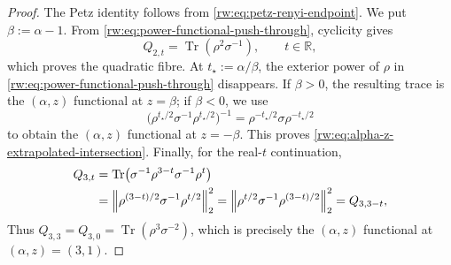 \documentclass[10pt,a4paper]{amsart}
\begin{document}
\begin{proof}
The Petz identity follows from
\eqref{rw:eq:petz-renyi-endpoint}.  We put $\beta:=\alpha-1$.  From
\eqref{rw:eq:power-functional-push-through}, cyclicity gives
\begin{equation}
 Q_{2,t}=\operatorname{Tr}(\rho^2\sigma^{-1}),
 \qquad t\in\mathbb R,
 \label{rw:eq:real-t-quadratic-identity}
\end{equation}
which proves the quadratic fibre.  At
$t_\star:=\alpha/\beta$, the exterior power of $\rho$ in
\eqref{rw:eq:power-functional-push-through} disappears.  If
$\beta>0$, the resulting trace is the $(\alpha,z)$ functional at
$z=\beta$; if $\beta<0$, we use
\begin{equation}
 \bigl(\rho^{t_\star/2}\sigma^{-1}
       \rho^{t_\star/2}\bigr)^{-1}
 =\rho^{-t_\star/2}\sigma\rho^{-t_\star/2}
 \label{rw:eq:negative-branch-inversion}
\end{equation}
to obtain the $(\alpha,z)$ functional at $z=-\beta$.  This proves
\eqref{rw:eq:alpha-z-extrapolated-intersection}.  Finally, for the
real-$t$ continuation,
\begin{align}
 Q_{3,t}
 &=\operatorname{Tr}\!\left(
   \sigma^{-1}\rho^{3-t}\sigma^{-1}\rho^t\right)\notag\\
 &=\left\|\rho^{(3-t)/2}\sigma^{-1}\rho^{t/2}\right\|_2^2
 =\left\|\rho^{t/2}\sigma^{-1}\rho^{(3-t)/2}\right\|_2^2
 =Q_{3,3-t},
 \label{rw:eq:cubic-reflection}
\end{align}
Thus $Q_{3,3}=Q_{3,0}=\operatorname{Tr}(\rho^3\sigma^{-2})$, which
is precisely the $(\alpha,z)$ functional at $(\alpha,z)=(3,1)$.


\end{proof}
\end{document}
